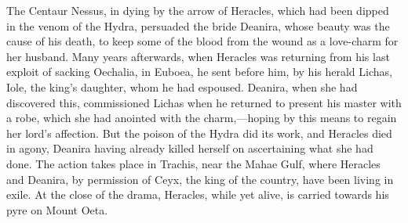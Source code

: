 \documentclass[11pt,letter]{book}
\begin{document}
\par  The Centaur Nessus, in dying by the arrow of Heracles, which had been dipped in the venom of the Hydra, persuaded the bride Deanira, whose beauty was the cause of his death, to keep some of the blood from the wound as a love-charm for her husband. Many years afterwards, when Heracles was returning from his last exploit of sacking Oechalia, in Euboea, he sent before him, by his herald Lichas, Iole, the king’s daughter, whom he had espoused. Deanira, when she had discovered this, commissioned Lichas when he returned to present his master with a robe, which she had anointed with the charm,—hoping by this means to regain her lord’s affection. But the poison of the Hydra did its work, and Heracles died in agony, Deanira having already killed herself on ascertaining what she had done. The action takes place in Trachis, near the Mahae Gulf, where Heracles and Deanira, by permission of Ceyx, the king of the country, have been living in exile. At the close of the drama, Heracles, while yet alive, is carried towards his pyre on Mount Oeta.

\par  [page 177]
\end{document}
